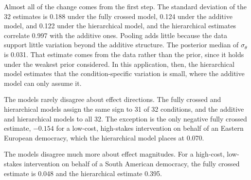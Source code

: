 \documentclass[12pt]{article}
\begin{document}
Almost all of the change comes from the first step.
The standard deviation of the 32 estimates is 0.188 under the fully crossed model, 0.124 under the additive model, and 0.122 under the hierarchical model, and the hierarchical estimates correlate 0.997 with the additive ones.
Pooling adds little because the data support little variation beyond the additive structure. The posterior median of $\sigma_\theta$ is 0.031.
That estimate comes from the data rather than the prior, since it holds under the weakest prior considered.
In this application, then, the hierarchical model estimates that the condition-specific variation is small, where the additive model can only assume it.

The models rarely disagree about effect directions.
The fully crossed and hierarchical models assign the same sign to 31 of 32 conditions, and the additive and hierarchical models to all 32.
The exception is the only negative fully crossed estimate, $-0.154$ for a low-cost, high-stakes intervention on behalf of an Eastern European democracy, which the hierarchical model places at 0.070.

The models disagree much more about effect magnitudes.
For a high-cost, low-stakes intervention on behalf of a South American democracy, the fully crossed estimate is 0.048 and the hierarchical estimate 0.395.

%
%
\end{document}
